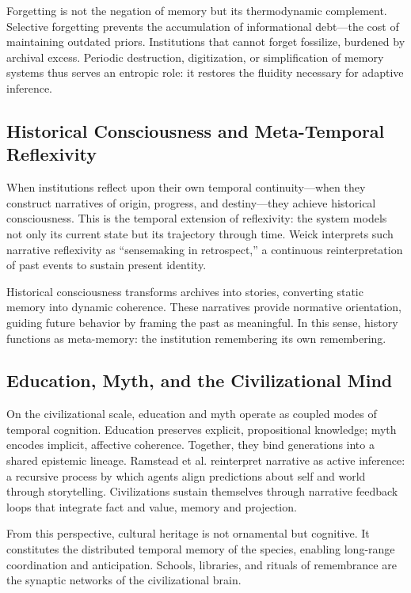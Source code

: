 \documentclass[11pt,a4paper]{article}
\begin{document}
Forgetting is not the negation of memory but its thermodynamic complement.  Selective forgetting prevents the accumulation of informational debt—the cost of maintaining outdated priors.  Institutions that cannot forget fossilize, burdened by archival excess.  Periodic destruction, digitization, or simplification of memory systems thus serves an entropic role: it restores the fluidity necessary for adaptive inference.

\subsection{Historical Consciousness and Meta-Temporal Reflexivity}

When institutions reflect upon their own temporal continuity—when they construct narratives of origin, progress, and destiny—they achieve historical consciousness.  This is the temporal extension of reflexivity: the system models not only its current state but its trajectory through time.  Weick \citep{Weick1979SocialPsychOrganization} interprets such narrative reflexivity as “sensemaking in retrospect,” a continuous reinterpretation of past events to sustain present identity.

Historical consciousness transforms archives into stories, converting static memory into dynamic coherence.  These narratives provide normative orientation, guiding future behavior by framing the past as meaningful.  In this sense, history functions as meta-memory: the institution remembering its own remembering.

\subsection{Education, Myth, and the Civilizational Mind}

On the civilizational scale, education and myth operate as coupled modes of temporal cognition.  Education preserves explicit, propositional knowledge; myth encodes implicit, affective coherence.  Together, they bind generations into a shared epistemic lineage.  Ramstead et al. \citep{Ramstead2024NarrativeActiveInference} reinterpret narrative as active inference: a recursive process by which agents align predictions about self and world through storytelling.  Civilizations sustain themselves through narrative feedback loops that integrate fact and value, memory and projection.

From this perspective, cultural heritage is not ornamental but cognitive.  It constitutes the distributed temporal memory of the species, enabling long-range coordination and anticipation.  Schools, libraries, and rituals of remembrance are the synaptic networks of the civilizational brain.
\end{document}
